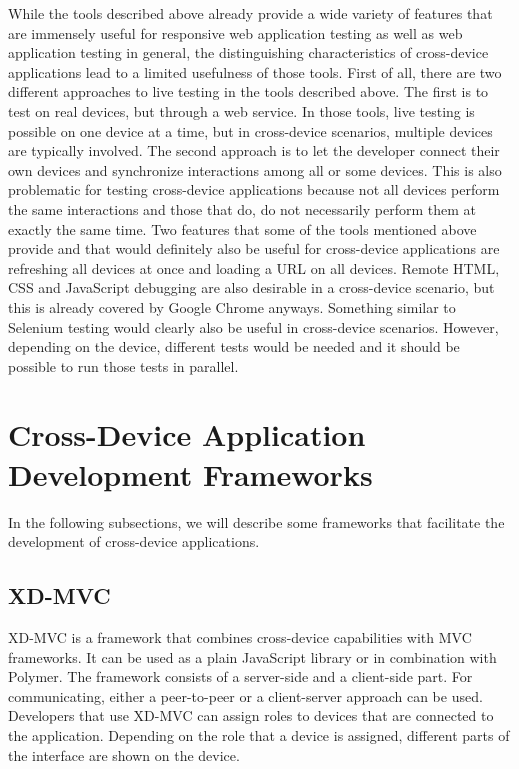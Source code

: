 While the tools described above already provide a wide variety of features that are immensely useful for responsive web application testing as well as web application testing in general, the distinguishing characteristics of cross-device applications lead to a limited usefulness of those tools. First of all, there are two different approaches to live testing in the tools described above. The first is to test on real devices, but through a web service. In those tools, live testing is possible on one device at a time, but in cross-device scenarios, multiple devices are typically involved. The second approach is to let the developer connect their own devices and synchronize interactions among all or some devices. This is also problematic for testing cross-device applications because not all devices perform the same interactions and those that do, do not necessarily perform them at exactly the same time. Two features that some of the tools mentioned above provide and that would definitely also be useful for cross-device applications are refreshing all devices at once and loading a URL on all devices. Remote HTML, CSS and JavaScript debugging are also desirable in a cross-device scenario, but this is already covered by Google Chrome anyways. Something similar to Selenium testing would clearly also be useful in cross-device scenarios. However, depending on the device, different tests would be needed and it should be possible to run those tests in parallel.

\section{Cross-Device Application Development Frameworks}

In the following subsections, we will describe some frameworks that facilitate the development of cross-device applications.

\subsection{XD-MVC}

XD-MVC is a framework that combines cross-device capabilities with MVC frameworks. It can be used as a plain JavaScript library or in combination with Polymer. The framework consists of a server-side and a client-side part. For communicating, either a peer-to-peer or a client-server approach can be used. Developers that use XD-MVC can assign roles to devices that are connected to the application. Depending on the role that a device is assigned, different parts of the interface are shown on the device. 

